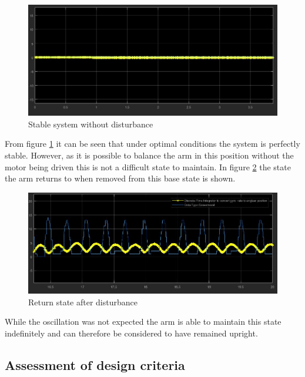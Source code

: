 \documentclass[11pt, a4paper,twocolumn ]{article}
\begin{document}
	\begin{figure}[h!]
	\begin{center}
	\includegraphics[width=\linewidth]{Undisturbed.jpg}
	\caption{Stable system without disturbance}
	\label{fig:4.1}
	\end{center}
	\end{figure}
From figure \ref{fig:4.1} it can be seen that under optimal conditions the system is perfectly stable. However, as it is possible to balance the arm in this position without the motor being driven this is not a difficult state to maintain. In figure \ref{fig:4.2} the state the arm returns to when removed from this base state is shown.
	\begin{figure}[h!]
	\begin{center}
	\includegraphics[width=\linewidth]{Ocilation.jpg}
	\caption{Return state after disturbance}
	\label{fig:4.2}
	\end{center}
	\end{figure}
While the oscillation was not expected the arm is able to maintain this state indefinitely and can therefore be considered to have remained upright.

        \subsection{Assessment of design criteria}\label{subsec:assessment}
\end{document}
